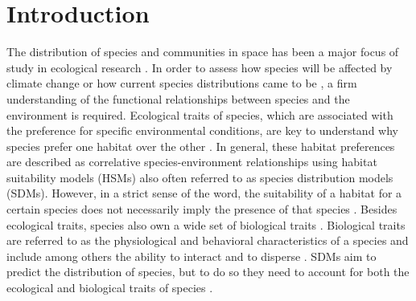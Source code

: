 \documentclass[12pt,authoryear]{elsarticle}
\begin{document}


\section{Introduction}
\label{Introduction}

The distribution of species and communities in space has been a major focus of study in ecological research \citep{Austin2002,Guisan2005,Elith2009}. In order to assess how species will be affected by climate change \citep{Ramirez-Villegas2014,Dulvy2008,Austin2011} or how current species distributions came to be \citep{Wiens2004,Varela2011}, a firm understanding of the functional relationships between species and the environment is required. Ecological traits of species, which are associated with the preference for specific environmental conditions, are key to understand why species prefer one habitat over the other \citep{Stoll2014}. In general, these habitat preferences are described as correlative species-environment relationships using habitat suitability models (HSMs) also often referred to as species distribution models (SDMs). However, in a strict sense of the word, the suitability of a habitat for a certain species does not necessarily imply the presence of that species \citep{Meynard2013}. Besides ecological traits, species also own a wide set of biological traits \citep{Costello2015}. Biological traits are referred to as the physiological and behavioral characteristics of a species and include among others the ability to interact and to disperse \citep{Costello2015}. SDMs aim to predict the distribution of species, but to do so they need to account for both the ecological and biological traits of species \citep{Forio2017,Verberk2010}. 
\end{document}
